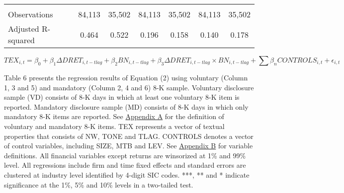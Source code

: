 \begin{table}[H]
\begin{center}
\begin{tabular}{lcccccc}
  		&&&&&&\\
  		Observations & 84,113 & 35,502 & 84,113 & 35,502 & 84,113 & 35,502 \\
  		Adjusted R-squared & 0.464 & 0.522 & 0.196 & 0.158 & 0.140 & 0.178 \\
  		\bottomrule
  		\bottomrule
  	\end{tabular}%
  \end{center}
	\begin{footnotesize}
		\setcounter{equation}{1}
		\begin{equation}
			TEX_{i,t}=\beta_0+\beta_1\Delta DRET_{i,t-tlag}+\beta_2BN_{i,t-tlag}+\beta_3\Delta DRET_{i,t-tlag}\times BN_{i,t-tlag}+\sum\beta_nCONTROLS_{i,t}+\epsilon_{i,t}
		\end{equation}
		
		\noindent Table 6 presents the regression results of Equation (2) using voluntary (Column 1, 3 and 5) and mandatory (Column 2, 4 and 6) 8-K sample. Voluntary disclosure sample (VD) consists of 8-K days in which at least one voluntary 8-K item is reported. Mandatory disclosure sample (MD) consists of 8-K days in which only mandatory 8-K items are reported. See \hyperref[appa]{Appendix A} for the definition of voluntary and mandatory 8-K items. TEX represents a vector of textual properties that consists of NW, TONE and TLAG. CONTROLS denotes a vector of control variables, including SIZE, MTB and LEV. See \hyperref[appb]{Appendix B} for variable definitions. All financial variables except returns are winsorized at 1\% and 99\% level. All regressions include firm and time fixed effects and standard errors are clustered at industry level identified by 4-digit SIC codes. ***, ** and * indicate significance at the 1\%, 5\% and 10\% levels in a two-tailed test.
	\end{footnotesize}
\end{table}%
